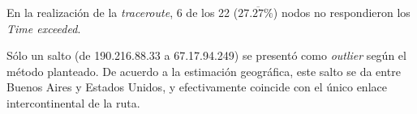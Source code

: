 \par En la realización de la \textit{traceroute}, 6 de los 22 ($27.\overline{27}\%$) nodos no respondieron los \textit{Time exceeded}.

\par Sólo un salto (de 190.216.88.33 a 67.17.94.249) se presentó como \textit{outlier} según el método planteado.
De acuerdo a la estimación geográfica, este salto se da entre Buenos Aires y Estados Unidos, y efectivamente coincide con el único enlace intercontinental de la ruta.
